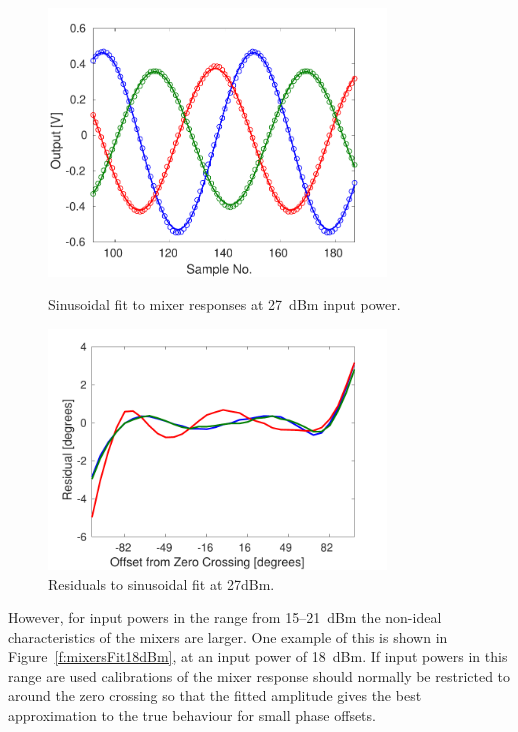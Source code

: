 \begin{figure}
  \centering
  \includegraphics[width=0.8\textwidth]{Figures/phaseMons/mixersFit27dBm}
  \caption{Sinusoidal fit to mixer responses at 27~dBm input power.}
  \label{f:mixersFit27dBm}
  \includegraphics[width=0.8\textwidth]{Figures/phaseMons/mixersFitResid27dBm}
  \caption{Residuals to sinusoidal fit at 27dBm.}
  \label{f:mixersFitResid27dBm}
\end{figure}

However, for input powers in the range from 15--21~dBm the non-ideal characteristics of the mixers are larger. One example of this is shown in Figure~\ref{f:mixersFit18dBm}, at an input power of 18~dBm. If input powers in this range are used calibrations of the mixer response should normally be restricted to around the zero crossing so that the fitted amplitude gives the best approximation to the true behaviour for small phase offsets. 

